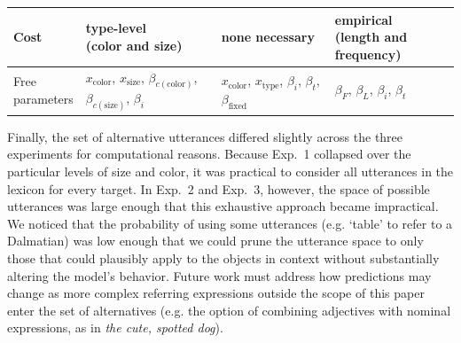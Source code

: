 \documentclass[11pt]{article}
\begin{document}
\begin{table}
\begin{tabular}{p{2.5cm} p{4.2cm} p{4.2cm} p{4.2cm} }
\midrule
Cost & \makecell{type-level \\ (color and size)}& none necessary & \makecell{empirical \\ (length and frequency)} \\
\midrule
\makecell{Free\\ parameters} & 
	\makecell{$x_{\textrm{color}}$, $x_{\textrm{size}}$, \\ $\beta_{c(\textrm{color})}$,  $\beta_{c(\textrm{size})}$, $\beta_i$} & 
	\makecell{$x_{\textrm{color}}$, $x_{\textrm{type}}$, \\ $\beta_i$, $\beta_t$, $\beta_{\textrm{fixed}}$} & 
	$\beta_F$, $\beta_L$, $\beta_i$, $\beta_t$ \\
\bottomrule
\end{tabular}
\label{tab:modeldiffs}
\end{table}

Finally, the set of alternative utterances differed slightly across the three experiments for computational reasons.
Because Exp.~1 collapsed over the particular levels of size and color, it was practical to consider all utterances in the lexicon for every target. 
In Exp.~2 and Exp.~3, however, the space of possible utterances was large enough that this exhaustive approach became impractical. 
We noticed that the probability of using some utterances (e.g. `table' to refer to a Dalmatian)  was low enough that we could prune the utterance space to only those that could plausibly apply to the objects in context without substantially altering the model's behavior.
Future work must address how predictions may change as more complex referring expressions outside the scope of this paper enter the set of alternatives (e.g. the option of combining adjectives with nominal expressions, as in \emph{the cute, spotted dog}).
\end{document}

